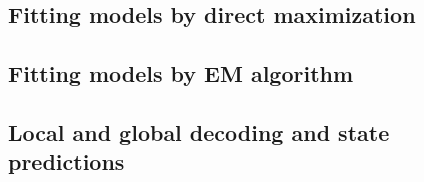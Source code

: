 \subsection{Fitting models by direct maximization}

\pagebreak

\subsection{Fitting models by EM algorithm}

\pagebreak

\subsection{Local and global decoding and state predictions}

\pagebreak

\nocite{zucchini09}
\nocite{cappe05}




